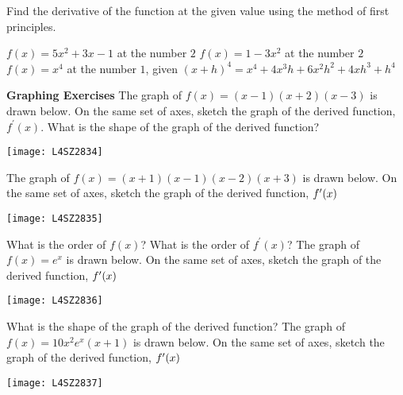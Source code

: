 \begin{Exercise}[title={Differentiation from First Principles}, label=exFirstPrinciples]
	\Question Find the derivative of the function at the given value using the method of first principles.
	\begin{tasks}
		\task $f (x) =5 x^{2} +3 x -1$ at the number $2$%
		\task $f (x) =1 -3 x^{2}$ at the number $2$%
		\task $f (x) =x^{4}$ at the number $1$, given $(x +h)^{4} =x^{4} +4 x^{3} h +6 x^{2} h^{2} +4 x h^{3} +h^{4}$%
	\end{tasks}

{\hspace{-0.6cm}\textbf{Graphing Exercises}}	
\Question The graph of $f (x) =(x -1) (x +2) (x -3)$ is drawn below. On the same set of axes, sketch the graph of the derived function, $f^{ \prime } (x)$. What is the shape of the graph of the derived function?\\
\begin{center}
\texttt{[image: L4SZ2834]}
\end{center}

\Question The graph of $f (x) =(x +1) (x -1) (x -2) (x +3)$ is drawn below. On the same set of axes, sketch the graph of the derived function, $f^{ \prime } (x)\vspace{+0.500000cm}$ \\
\begin{center}\texttt{[image: L4SZ2835]}\end{center}
What is the order of $f (x)$? What is the order of $f^{ \prime } (x)$?%
\Question The graph of $f (x) =e^{x}$ is drawn below. On the same set of axes, sketch the graph of the derived function, $f^{ \prime } (x)\vspace{+0.500000cm}$ \\
\begin{center}\texttt{[image: L4SZ2836]}\end{center}
What is the shape of the graph of the derived function?	
\Question The graph of $f (x) =10 x^{2} e^{x} (x +1)$ is drawn below. On the same set of axes, sketch the graph of the derived function, $f^{ \prime } (x)\vspace{+0.500000cm}$ \\
\begin{center}\texttt{[image: L4SZ2837]}\end{center}%


\end{Exercise}
